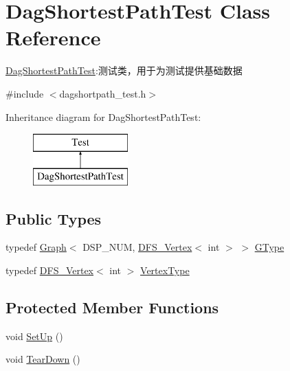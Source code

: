 \hypertarget{class_dag_shortest_path_test}{}\section{Dag\+Shortest\+Path\+Test Class Reference}
\label{class_dag_shortest_path_test}


\hyperlink{class_dag_shortest_path_test}{Dag\+Shortest\+Path\+Test}\+:测试类，用于为测试提供基础数据  




{\ttfamily \#include $<$dagshortpath\+\_\+test.\+h$>$}

Inheritance diagram for Dag\+Shortest\+Path\+Test\+:\begin{figure}[H]
\begin{center}
\leavevmode
\includegraphics[height=2.000000cm]{class_dag_shortest_path_test}
\end{center}
\end{figure}
\subsection*{Public Types}
\begin{DoxyCompactItemize}
\item 
typedef \hyperlink{struct_introduction_to_algorithm_1_1_graph_algorithm_1_1_graph}{Graph}$<$ D\+S\+P\+\_\+\+N\+U\+M, \hyperlink{struct_introduction_to_algorithm_1_1_graph_algorithm_1_1_d_f_s___vertex}{D\+F\+S\+\_\+\+Vertex}$<$ int $>$ $>$ \hyperlink{class_dag_shortest_path_test_a55e732c7641684c040cf6a6a2a836efe}{G\+Type}
\item 
typedef \hyperlink{struct_introduction_to_algorithm_1_1_graph_algorithm_1_1_d_f_s___vertex}{D\+F\+S\+\_\+\+Vertex}$<$ int $>$ \hyperlink{class_dag_shortest_path_test_ad753154b61e842c086aff729e02b55ba}{Vertex\+Type}
\end{DoxyCompactItemize}
\subsection*{Protected Member Functions}
\begin{DoxyCompactItemize}
\item 
void \hyperlink{class_dag_shortest_path_test_a380ad10219669325d8c5e2ce8842a2ff}{Set\+Up} ()
\item 
void \hyperlink{class_dag_shortest_path_test_a8b59d67cc393896d103723fd6eaa6a96}{Tear\+Down} ()
\end{DoxyCompactItemize}
